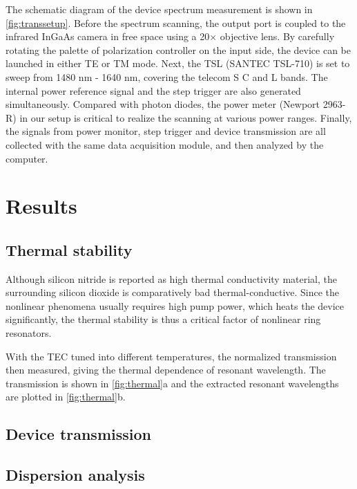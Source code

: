 The schematic diagram of the device spectrum measurement is shown in \autoref{fig:transsetup}. Before the spectrum scanning, the output port is coupled to the infrared InGaAs camera in free space using a 20$\times$ objective lens. By carefully rotating the palette of polarization controller on the input side, the device can be launched in either TE or TM mode. Next, the TSL (SANTEC TSL-710) is set to sweep from 1480 nm - 1640 nm, covering the telecom S C and L bands. The internal power reference signal and the step trigger are also generated simultaneously. Compared with photon diodes, the power meter (Newport 2963-R) in our setup is critical to realize the scanning at various power ranges.  Finally, the signals from power monitor, step trigger and device transmission are all collected with the same data acquisition module, and then analyzed by the computer.

\section{Results}

\subsection{Thermal stability}

\begin{figure}
	\centering
	
	\mycaption{}{}
	\label{fig:thermal}
\end{figure}

%	

Although silicon nitride is reported as high thermal conductivity material, the surrounding silicon dioxide is comparatively bad thermal-conductive. Since the nonlinear phenomena usually requires high pump power, which heats the device significantly, the thermal stability is thus a critical factor of nonlinear ring resonators.

With the TEC tuned into different temperatures, the normalized transmission then measured, giving the thermal dependence of resonant wavelength. The transmission is shown in \autoref{fig:thermal}a and the extracted resonant wavelengths are plotted in \autoref{fig:thermal}b.

\subsection{Device transmission}

\subsection{Dispersion analysis}
